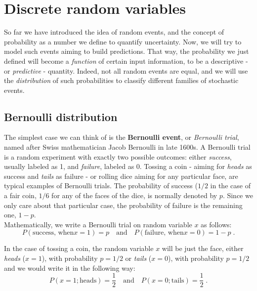 \documentclass{book}
\begin{document}
\section{Discrete random variables}

So far we have introduced the idea of random events, and the concept of probability as a number we define to quantify uncertainty. Now, we will try to model such events aiming to build predictions. That way, the probability we just defined will become a \textit{function} of certain input information, to be a descriptive - or \textit{predictive} - quantity. Indeed, not all random events are equal, and we will use the \textit{distribution} of such probabilities to classify different families of stochastic events.
  
 \subsection{Bernoulli distribution}

The simplest case we can think of is the \textbf{Bernoulli event}, or \textit{Bernoulli trial}, named after Swiss mathematician Jacob Bernoulli in late 1600s. A Bernoulli trial is a random experiment with exactly two possible outcomes: either \textit{success}, usually labeled as 1, and \textit{failure}, labeled as 0. Tossing a coin - aiming for \textit{heads} as success and \textit{tails} as failure - or rolling dice aiming for any particular face, are typical examples of Bernoulli trials. The probability of success ($1/2$ in the case of a fair coin, $1/6$ for any of the faces of the dice, is normally denoted by $p$. Since we only care about that particular case, the probability of failure is the remaining one, $1 - p$.\\

Mathematically, we write a Bernoulli trial on random variable $x$ as follows:
\begin{equation}
	P(\text{success, when} x = 1) = p \quad \text{and} \quad P(\text{failure, when} x = 0) = 1 - p \; .
	\label{eq:bernoulli}
\end{equation}

In the case of tossing a coin, the random variable $x$ will be just the face, either \textit{heads} ($x = 1$), with probability $p = 1/2$ or \textit{tails} ($x = 0$), with probability $p = 1/2$ and we would write it in the following way:
\begin{equation}
	P(x = 1; \text{heads}) = \frac{1}{2} \quad \text{and} \quad P(x = 0; \text{tails}) = \frac{1}{2} \; .
	\label{eq:bernoulli_1}
\end{equation}
\end{document}
